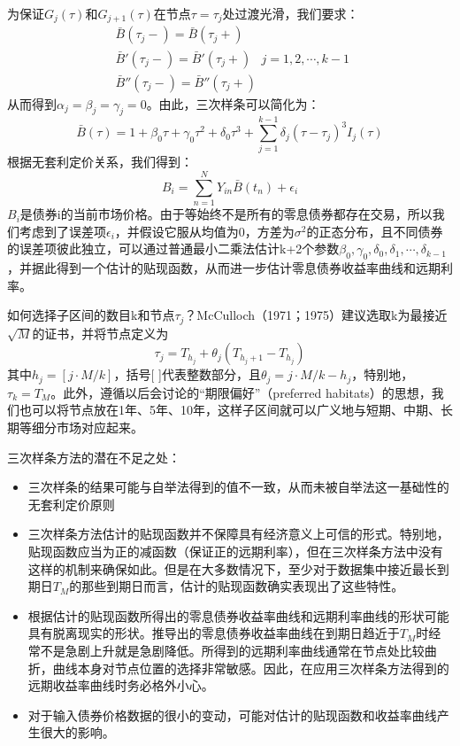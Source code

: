 \documentclass[UTF8]{ctexart}
\begin{document}
为保证$G_j(\tau) $和$ G_{j+1}(\tau)$在节点$\tau=\tau_j$处过渡光滑，我们要求：
$$
\begin{array}{l}
\bar B(\tau_j-) = \bar B(\tau_j+) \\
\bar B'(\tau_j-) = \bar B'(\tau_j+) \\
\bar B''(\tau_j-) = \bar B''(\tau_j+) 
\end{array}
j = 1,2,\cdots,k-1
$$
从而得到$\alpha_j=\beta_j=\gamma_j=0$。由此，三次样条可以简化为：
$$\bar B(\tau)=1+\beta_0 \tau + \gamma_0 \tau^2 + \delta_0 \tau^3 + \sum\limits_{j=1}^{k-1}\delta_j(\tau-\tau_j)^3 I_j(\tau)$$
根据无套利定价关系，我们得到：
$$B_i=\sum\limits_{n=1}^N Y_{in} \bar B(t_n)+\epsilon_i$$
$B_i$是债券i的当前市场价格。由于等始终不是所有的零息债券都存在交易，所以我们考虑到了误差项$\epsilon_i$，并假设它服从均值为0，方差为$\sigma^2$的正态分布，且不同债券的误差项彼此独立，可以通过普通最小二乘法估计k+2个参数$\beta_0,\gamma_0,\delta_0,\delta_1,\cdots,\delta_{k-1}$，并据此得到一个估计的贴现函数，从而进一步估计零息债券收益率曲线和远期利率。

如何选择子区间的数目k和节点$\tau_j$？McCulloch（1971；1975）建议选取k为最接近$\sqrt M$的证书，并将节点定义为
$$\tau_j=T_{h_j}+\theta_j(T_{h_j + 1} - T_{h_j})$$
其中$h_j=[j \cdot M/k]$，括号[ ]代表整数部分，且$\theta_j=j \cdot M/k-h_j$，特别地，$\tau_k=T_M$。此外，遵循以后会讨论的“期限偏好”（preferred habitats）的思想，我们也可以将节点放在1年、5年、10年，这样子区间就可以广义地与短期、中期、长期等细分市场对应起来。

三次样条方法的潜在不足之处：
\begin{itemize}
\item{三次样条的结果可能与自举法得到的值不一致，从而未被自举法这一基础性的无套利定价原则}
\item{三次样条方法估计的贴现函数并不保障具有经济意义上可信的形式。特别地，贴现函数应当为正的减函数（保证正的远期利率），但在三次样条方法中没有这样的机制来确保如此。但是在大多数情况下，至少对于数据集中接近最长到期日$T_M$的那些到期日而言，估计的贴现函数确实表现出了这些特性。}
\item{根据估计的贴现函数所得出的零息债券收益率曲线和远期利率曲线的形状可能具有脱离现实的形状。推导出的零息债券收益率曲线在到期日趋近于$T_M$时经常不是急剧上升就是急剧降低。所得到的远期利率曲线通常在节点处比较曲折，曲线本身对节点位置的选择非常敏感。因此，在应用三次样条方法得到的远期收益率曲线时务必格外小心。}
\item{对于输入债券价格数据的很小的变动，可能对估计的贴现函数和收益率曲线产生很大的影响。}
\end{itemize}
\end{document}
